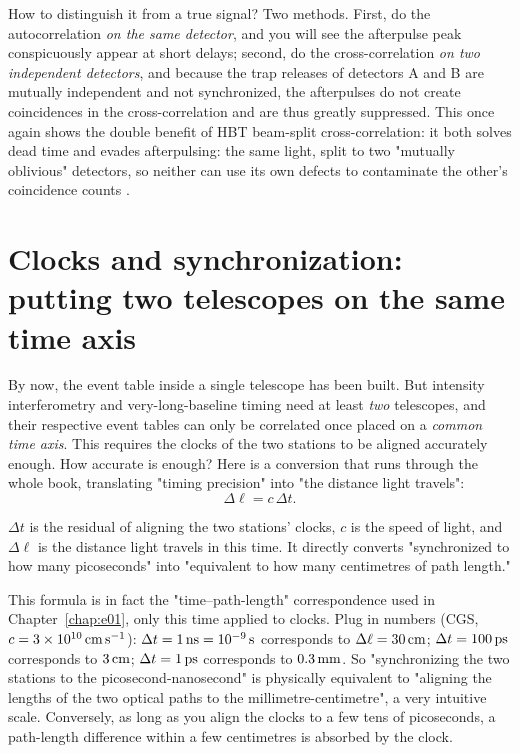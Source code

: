 How to distinguish it from a true signal? Two methods. First, do the autocorrelation \emph{on the same detector}, and you will see the afterpulse peak conspicuously appear at short delays; second, do the cross-correlation \emph{on two independent detectors}, and because the trap releases of detectors A and B are mutually independent and not synchronized, the afterpulses do not create coincidences in the cross-correlation and are thus greatly suppressed. This once again shows the double benefit of HBT beam-split cross-correlation: it both solves dead time and evades afterpulsing: the same light, split to two "mutually oblivious" detectors, so neither can use its own defects to contaminate the other's coincidence counts \citep{1957RSPSA.242..300B,1996ApOpt..35.1956C,2020RScI...91a3108W}.

\section{Clocks and synchronization: putting two telescopes on the same time axis}
\label{sec:e13-clock}

By now, the event table inside a single telescope has been built. But intensity interferometry and very-long-baseline timing need at least \emph{two} telescopes, and their respective event tables can only be correlated once placed on a \emph{common time axis}. This requires the clocks of the two stations to be aligned accurately enough. How accurate is enough? Here is a conversion that runs through the whole book, translating "timing precision" into "the distance light travels":
\begin{equation}
  \Delta\ell = c\,\Delta t .
  \label{eq:e13-lightpath}
\end{equation}
\begin{formulaexplain}
$\Delta t$ is the residual of aligning the two stations' clocks, $c$ is the speed of light, and $\Delta\ell$ is the distance light travels in this time. It directly converts "synchronized to how many picoseconds" into "equivalent to how many centimetres of path length."
\end{formulaexplain}
This formula is in fact the "time--path-length" correspondence used in Chapter~\ref{chap:e01}, only this time applied to clocks. Plug in numbers (CGS, $c=3\times10^{10}\,{\rm cm\,s^{-1}}$): $\Delta t=1\,{\rm ns}=10^{-9}\,{\rm s}$ corresponds to $\Delta\ell=30\,{\rm cm}$; $\Delta t=100\,{\rm ps}$ corresponds to $3\,{\rm cm}$; $\Delta t=1\,{\rm ps}$ corresponds to $0.3\,{\rm mm}$. So "synchronizing the two stations to the picosecond-nanosecond" is physically equivalent to "aligning the lengths of the two optical paths to the millimetre-centimetre", a very intuitive scale. Conversely, as long as you align the clocks to a few tens of picoseconds, a path-length difference within a few centimetres is absorbed by the clock.

